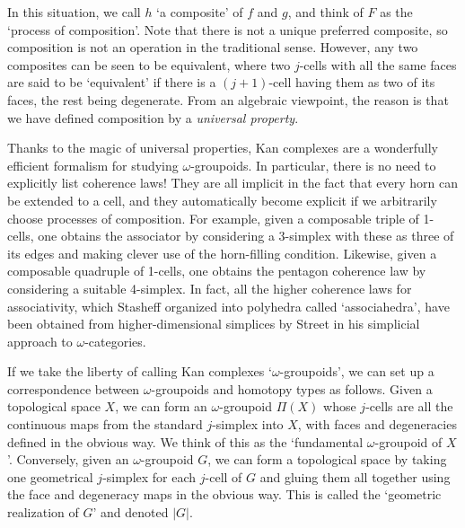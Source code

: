 \noindent In this situation, we call $h$ `a composite' of $f$ and $g$,
and think of $F$ as the `process of composition'.  Note that there is
not a unique preferred composite, so composition is not an operation in
the traditional sense.   However, any two composites can be seen to be
equivalent, where two $j$-cells with all the same faces are said to be
`equivalent' if there is a $(j+1)$-cell having them as two of its faces,
the rest being degenerate.    From an algebraic viewpoint, the reason is
that we have defined composition by a {\it universal property}.   

Thanks to the magic of universal properties, Kan complexes are a
wonderfully efficient formalism for studying $\omega$-groupoids. In
particular, there is no need to explicitly list coherence laws!  They
are all implicit in the fact that every horn can be extended to a cell,
and they automatically become explicit if we arbitrarily choose
processes of composition.  For example, given a composable triple of
1-cells, one obtains the associator by considering a 3-simplex with
these as three of its edges and making clever use of the horn-filling
condition.  Likewise, given a composable quadruple of 1-cells, one
obtains the pentagon coherence law by considering a suitable 4-simplex. 
In fact, all the higher coherence laws for associativity, which Stasheff
\cite{Stasheff} organized into polyhedra called `associahedra', have
been obtained from higher-dimensional simplices by Street \cite{Street}
in his simplicial approach to $\omega$-categories.

If we take the liberty of calling Kan complexes `$\omega$-groupoids', we
can set up a correspondence between $\omega$-groupoids and homotopy
types as follows.  Given a topological space $X$, we can form an
$\omega$-groupoid $\Pi(X)$ whose $j$-cells are all the continuous maps
from the standard $j$-simplex into $X$, with faces and degeneracies
defined in the obvious way.  We think of this as the `fundamental
$\omega$-groupoid of $X$'.   Conversely, given an $\omega$-groupoid $G$,
we can form a topological space by taking one geometrical $j$-simplex
for each $j$-cell of $G$ and gluing them all together using the face and
degeneracy maps in the obvious way.  This is called the `geometric
realization of $G$' and denoted $|G|$.    

